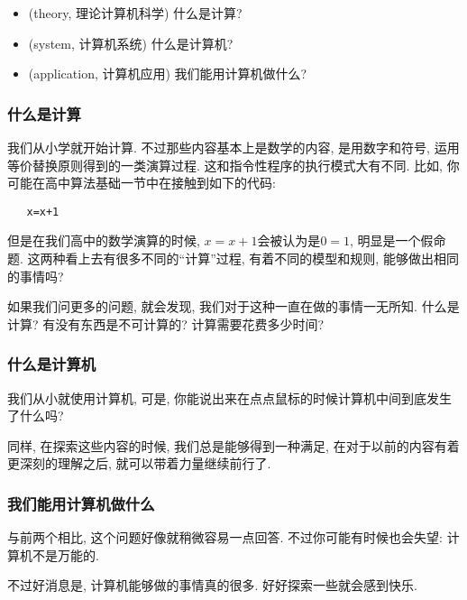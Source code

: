    \begin{itemize}
    \item (theory, 理论计算机科学) 什么是计算?
    \item (system, 计算机系统) 什么是计算机?
    \item (application, 计算机应用) 我们能用计算机做什么?
   \end{itemize}

   \subsubsection{什么是计算}

   我们从小学就开始计算. 不过那些内容基本上是数学的内容, 是用数字和符号, 运用等价替换原则得到的一类演算过程. 这和指令性程序的执行模式大有不同. 比如, 你可能在高中算法基础一节中在接触到如下的代码: 
   \begin{verbatim}
   x=x+1 
   \end{verbatim}
   但是在我们高中的数学演算的时候, $x=x+1$会被认为是$0=1$, 明显是一个假命题. 这两种看上去有很多不同的``计算''过程, 有着不同的模型和规则, 能够做出相同的事情吗?

   如果我们问更多的问题, 就会发现, 我们对于这种一直在做的事情一无所知. 什么是计算? 有没有东西是不可计算的? 计算需要花费多少时间? 
   
   \subsubsection{什么是计算机}

   我们从小就使用计算机, 可是, 你能说出来在点点鼠标的时候计算机中间到底发生了什么吗? 

   同样, 在探索这些内容的时候, 我们总是能够得到一种满足, 在对于以前的内容有着更深刻的理解之后, 就可以带着力量继续前行了.

   \subsubsection{我们能用计算机做什么}

   与前两个相比, 这个问题好像就稍微容易一点回答. 不过你可能有时候也会失望: 计算机不是万能的. 

   不过好消息是, 计算机能够做的事情真的很多. 好好探索一些就会感到快乐. 
   

